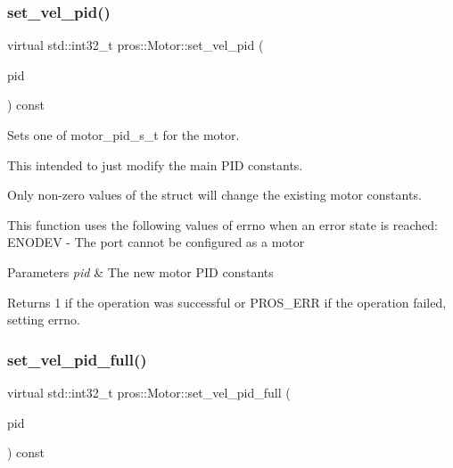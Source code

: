 \subsubsection{\texorpdfstring{set\+\_\+vel\+\_\+pid()}{set\_vel\_pid()}}
{\footnotesize\ttfamily virtual std\+::int32\+\_\+t pros\+::\+Motor\+::set\+\_\+vel\+\_\+pid (\begin{DoxyParamCaption}\item[{const \hyperlink{motors_8h_ad2e907c8d7ce53c1fd91f1b9801072e3}{motor\+\_\+pid\+\_\+s\+\_\+t}}]{pid }\end{DoxyParamCaption}) const\hspace{0.3cm}{\ttfamily [virtual]}}



Sets one of motor\+\_\+pid\+\_\+s\+\_\+t for the motor. 

This intended to just modify the main P\+ID constants.

Only non-\/zero values of the struct will change the existing motor constants.

This function uses the following values of errno when an error state is reached\+: E\+N\+O\+D\+EV -\/ The port cannot be configured as a motor


\begin{DoxyParams}{Parameters}
{\em pid} & The new motor P\+ID constants\\
\hline
\end{DoxyParams}
\begin{DoxyReturn}{Returns}
1 if the operation was successful or P\+R\+O\+S\+\_\+\+E\+RR if the operation failed, setting errno. 
\end{DoxyReturn}
\mbox{\label{classpros_1_1Motor_a7fc8eefc04c8b8aaefad75437b49f30a}} 
\subsubsection{\texorpdfstring{set\+\_\+vel\+\_\+pid\+\_\+full()}{set\_vel\_pid\_full()}}
{\footnotesize\ttfamily virtual std\+::int32\+\_\+t pros\+::\+Motor\+::set\+\_\+vel\+\_\+pid\+\_\+full (\begin{DoxyParamCaption}\item[{const \hyperlink{motors_8h_a0295cbf49f5c70c17b5fa962bd25febd}{motor\+\_\+pid\+\_\+full\+\_\+s\+\_\+t}}]{pid }\end{DoxyParamCaption}) const\hspace{0.3cm}{\ttfamily [virtual]}}



